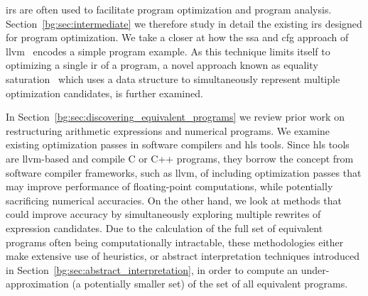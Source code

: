 \Glspl{ir} are often used to facilitate program optimization and program
analysis.  Section~\ref{bg:sec:intermediate} we therefore study in detail
the existing \glspl{ir} designed for program optimization.  We take a closer
at how the \gls{ssa} and \gls{cfg} approach of \gls{llvm}~\cite{llvm_ir}
encodes a simple program example.  As this technique limits itself to
optimizing a single \gls{ir} of a program, a novel approach known as equality
saturation~\cite{tate09} which uses a data structure to simultaneously
represent multiple optimization candidates, is further examined.

In Section~\ref{bg:sec:discovering_equivalent_programs} we review prior
work on restructuring arithmetic expressions and numerical programs.  We
examine existing optimization passes in software compilers and \gls{hls}
tools.  Since \gls{hls} tools are \gls{llvm}-based and compile C or C++
programs, they borrow the concept from software compiler frameworks, such as
\gls{llvm}, of including optimization passes that may improve performance
of floating-point computations, while potentially sacrificing numerical
accuracies.  On the other hand, we look at methods that could improve
accuracy by simultaneously exploring multiple rewrites of expression
candidates.  Due to the calculation of the full set of equivalent programs
often being computationally intractable, these methodologies either make
extensive use of heuristics, or abstract interpretation techniques introduced
in Section~\ref{bg:sec:abstract_interpretation}, in order to compute an
under-approximation (a potentially smaller set) of the set of all equivalent
programs.

